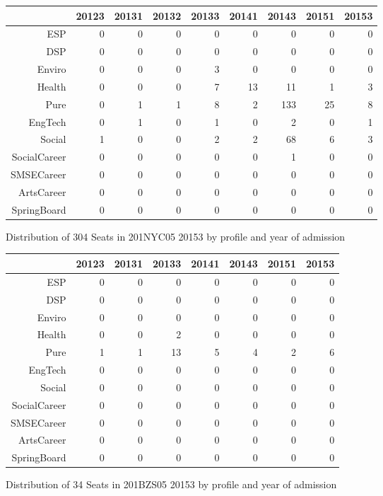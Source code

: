 \documentclass{article}\usepackage[]{graphicx}\usepackage[]{color}
\begin{document}
\begin{figure}[H]
\centering
\begin{tabular}{rrrrrrrrr}
  \hline
 & 20123 & 20131 & 20132 & 20133 & 20141 & 20143 & 20151 & 20153 \\ 
  \hline
ESP &   0 &   0 &   0 &   0 &   0 &   0 &   0 &   0 \\ 
  DSP &   0 &   0 &   0 &   0 &   0 &   0 &   0 &   0 \\ 
  Enviro &   0 &   0 &   0 &   3 &   0 &   0 &   0 &   0 \\ 
  Health &   0 &   0 &   0 &   7 &  13 &  11 &   1 &   3 \\ 
  Pure &   0 &   1 &   1 &   8 &   2 & 133 &  25 &   8 \\ 
  EngTech &   0 &   1 &   0 &   1 &   0 &   2 &   0 &   1 \\ 
  Social &   1 &   0 &   0 &   2 &   2 &  68 &   6 &   3 \\ 
  SocialCareer &   0 &   0 &   0 &   0 &   0 &   1 &   0 &   0 \\ 
  SMSECareer &   0 &   0 &   0 &   0 &   0 &   0 &   0 &   0 \\ 
  ArtsCareer &   0 &   0 &   0 &   0 &   0 &   0 &   0 &   0 \\ 
  SpringBoard &   0 &   0 &   0 &   0 &   0 &   0 &   0 &   0 \\ 
   \hline
\end{tabular}
\caption{Distribution of 304 Seats in 201NYC05 20153 by profile and year of admission} 
\end{figure}
\begin{figure}[H]
\centering
\begin{tabular}{rrrrrrrr}
  \hline
 & 20123 & 20131 & 20133 & 20141 & 20143 & 20151 & 20153 \\ 
  \hline
ESP &   0 &   0 &   0 &   0 &   0 &   0 &   0 \\ 
  DSP &   0 &   0 &   0 &   0 &   0 &   0 &   0 \\ 
  Enviro &   0 &   0 &   0 &   0 &   0 &   0 &   0 \\ 
  Health &   0 &   0 &   2 &   0 &   0 &   0 &   0 \\ 
  Pure &   1 &   1 &  13 &   5 &   4 &   2 &   6 \\ 
  EngTech &   0 &   0 &   0 &   0 &   0 &   0 &   0 \\ 
  Social &   0 &   0 &   0 &   0 &   0 &   0 &   0 \\ 
  SocialCareer &   0 &   0 &   0 &   0 &   0 &   0 &   0 \\ 
  SMSECareer &   0 &   0 &   0 &   0 &   0 &   0 &   0 \\ 
  ArtsCareer &   0 &   0 &   0 &   0 &   0 &   0 &   0 \\ 
  SpringBoard &   0 &   0 &   0 &   0 &   0 &   0 &   0 \\ 
   \hline
\end{tabular}
\caption{Distribution of 34 Seats in 201BZS05 20153 by profile and year of admission} 
\end{figure}
\end{document}
